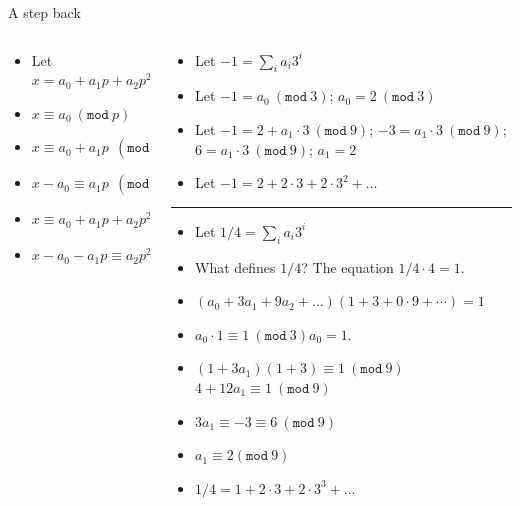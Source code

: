 \documentclass[8pt]{beamer}
\renewcommand{\mod}[1]{\left( \texttt{mod}~#1 \right)}
\begin{document}
\begin{frame}{A step back}
\begin{columns}
\begin{column}{.48\textwidth}
\begin{itemize}
\item Let $x = a_0 + a_1 p + a_2 p^2 + \dots$ \pause
\item  $x  \equiv a_0 ~\mod{p}$ \pause
\item  $x \equiv a_0 + a_1 p~~\mod{p^2} $ \pause
\item  $x - a_0 \equiv a_1 p~~\mod{p^2} $ \pause
\item  $x \equiv a_0 + a_1 p + a_2 p^2~\mod{p^3}$ \pause
\item  $x - a_0 - a_1 p \equiv a_2 p^2~\mod{p^3}$ \pause
\end{itemize}
\end{column}

\begin{column}{.48\textwidth}
{\footnotesize
\begin{itemize}
\item Let $-1 = \sum_i a_i 3^i$ \pause
\item Let $-1 = a_0 ~\mod{3}$\pause; $a_0 = 2~\mod{3}$\pause
\item Let $-1 = 2  + a_1 \cdot 3~\mod{9}$; \pause $-3 = a_1 \cdot 3~\mod{9}$; \pause $6 = a_1 \cdot 3~\mod{9}$; \pause $a_1 = 2$
\item Let $-1 = 2 + 2 \cdot 3 + 2 \cdot 3^2 + \dots$
\end{itemize}
\noindent\rule{2cm}{0.4pt}
\begin{itemize}
\item Let $1/4 = \sum_i a_i 3^i$ \pause
\item What defines $1/4$? \pause The equation $1/4 \cdot 4 = 1$.\pause
\item $(a_0 + 3a_1 + 9a_2 + \dots)(1 + 3 + 0 \cdot 9 + \cdots) = 1$\pause
\item $a_0 \cdot 1 \equiv 1~\mod{3}$\pause $a_0 = 1$.\pause
\item $(1 + 3a_1) (1 + 3) \equiv 1~\mod{9}$\pause  $4 + 12 a_1 \equiv 1~\mod{9}$\pause
\item $3a_1 \equiv -3 \equiv 6~\mod{9}$ \pause
\item $a_1 \equiv 2\mod{9}$\pause
\item $1/4 = 1 + 2\cdot 3 + 2 \cdot 3^3 + \dots$
\end{itemize}
}
\end{column}
\end{columns}
\end{frame}
\end{document}
